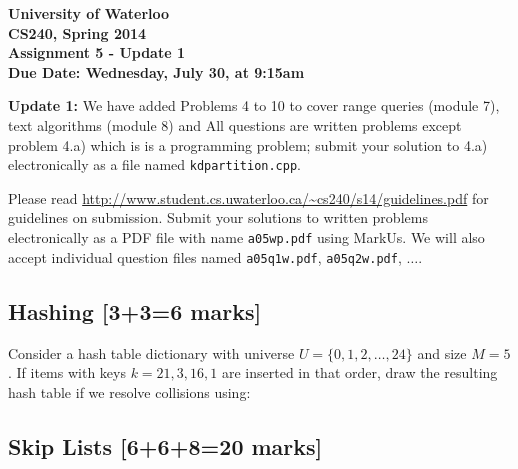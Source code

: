 \documentclass[12pt]{article}
\begin{document}
\begin{center}
  {\Large\bf University of Waterloo}\\ \vspace{3mm}
  {\Large\bf CS240, Spring 2014}\\ \vspace{2mm}
  {\Large\bf Assignment 5 - Update 1}\\ \vspace{3mm}
  \textbf{Due Date: Wednesday, July 30, at 9:15am}
\end{center}

\def\question#1{\item[\bf #1.]}
\def\part#1{\item[\bf #1)]}
\newcommand{\pc}[1]{\mbox{\textbf{#1}}} %

\textbf{Update 1: } We have added Problems 4 to 10 to cover
range queries (module 7), text algorithms (module 8) and
All questions are written problems except problem 4.a) which is
is a programming problem; submit your solution to 4.a) electronically
as a file named {\tt kdpartition.cpp}.

Please read
\url{http://www.student.cs.uwaterloo.ca/~cs240/s14/guidelines.pdf} for
guidelines on submission.
Submit your solutions to written problems electronically as a PDF file with
name {\tt a05wp.pdf} using MarkUs. We will also accept individual
question files named {\tt a05q1w.pdf}, {\tt a05q2w.pdf}, $\dots$.

\subsection{Hashing [3+3=6 marks]}
Consider a hash table dictionary with universe $U=\{0, 1, 2, \dots , 24\}$ and size $M =5$. If items with keys $k = 21, 3, 16, 1$ are inserted in that order, draw the resulting hash table if we resolve collisions using:

\subsection{Skip Lists [6+6+8=20 marks]}
\end{document}
